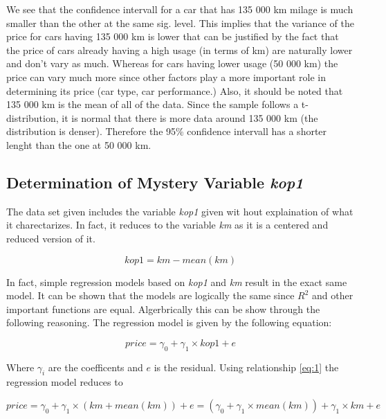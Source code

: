 \noindent
We see that the confidence intervall for a car that has 135 000 km milage is much smaller than the other at the same sig. level. This implies that the variance of the price for cars having 135 000 km is lower that can be justified by the fact that the price of cars already having a high usage (in terms of km) are naturally lower and don't vary as much. Whereas for cars having lower usage (50 000 km) the price can vary much more since other factors play a more important role in determining its price (car type, car performance.) Also, it should be noted that 135 000 km is the mean of all of the data. Since the sample follows a t-distribution, it is normal that there is more data around 135 000 km (the distribution is denser). Therefore the 95\% confidence intervall has a shorter lenght than the one at 50 000 km.

\subsection{Determination of Mystery Variable \textit{kop1}} %
\label{sub:det_myst_var}

The data set given includes the variable \textit{kop1} given wit hout explaination of what it charectarizes. In fact, it reduces to the variable \textit{km} as it is a centered and reduced version of it.

\begin{equation}\label{eq:1}
	kop1 = km - mean(km)
\end{equation}

\noindent
In fact, simple regression models based on \textit{kop1} and \textit{km} result in the exact same model. It can be shown that the models are logically the same since $R^2$ and other important functions are equal. Algerbrically this can be show through the following reasoning. The regression model is given by the following equation:

\begin{equation}\label{eq:price_kop1}
	price = \gamma_0 + \gamma_1 \times kop1 + e
\end{equation}

\noindent
Where $\gamma_i$ are the coefficents and $e$ is the residual. Using relationship \ref{eq:1} the regression model reduces to

\begin{equation}
	 price = \gamma_0 + \gamma_1 \times (km + mean(km))+ e = (\gamma_0 + \gamma_1 \times mean(km)) + \gamma_1 \times km + e
\end{equation}

